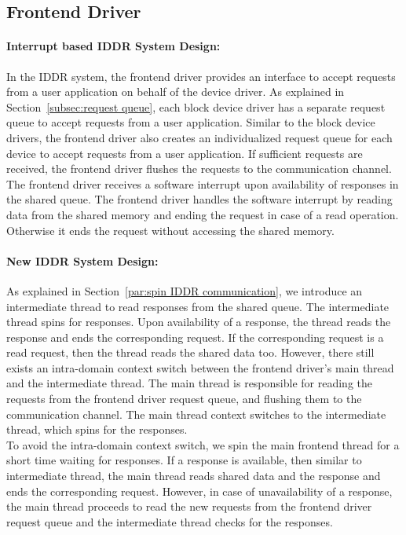\subsection{Frontend Driver}
\paragraph{Interrupt based IDDR System Design:}
In the IDDR system, the frontend driver provides an interface to accept requests from a user application on behalf of the device driver. As explained in Section~\ref{subsec:request queue}, each block device driver has a separate request queue to accept requests from a user application. Similar to the block device drivers, the frontend driver also creates an individualized request queue for each device to accept requests from a user application. If sufficient requests are received, the frontend driver flushes the requests to the communication channel. The frontend driver receives a software interrupt upon availability of responses in the shared queue. The frontend driver handles the software interrupt by reading data from the shared memory and ending the request in case of a read operation. Otherwise it ends the request without accessing the shared memory.

\paragraph{New IDDR System Design:}
As explained in Section~\ref{par:spin IDDR communication}, we introduce an intermediate thread to read responses from the shared queue. The intermediate thread spins for responses. Upon availability of a response, the thread reads the response and ends the corresponding request. If the corresponding request is a read request, then the thread reads the shared data too. However, there still exists an intra-domain context switch between the frontend driver's main thread and the intermediate thread. The main thread is responsible for reading the requests from the frontend driver request queue, and flushing them to the communication channel. The main thread context switches to the intermediate thread, which spins for the responses. 
\\[3mm]
To avoid the intra-domain context switch, we spin the main frontend thread for a short time waiting for responses. If a response is available, then similar to intermediate thread, the main thread reads shared data and the response and ends the corresponding request. However, in case of unavailability of a response, the main thread proceeds to read the new requests from the frontend driver request queue and the intermediate thread checks for the responses.  

